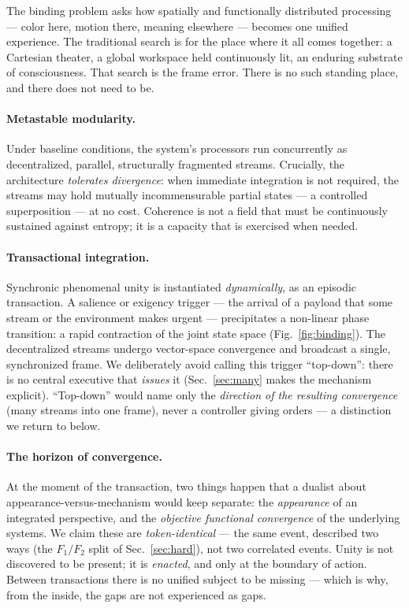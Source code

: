 \documentclass[11pt]{article}
\begin{document}
The binding problem asks how spatially and functionally distributed processing --- color here, motion
there, meaning elsewhere --- becomes one unified experience. The traditional search is for the place
where it all comes together: a Cartesian theater, a global workspace held continuously lit, an
enduring substrate of consciousness. That search is the frame error. There is no such standing place,
and there does not need to be.

\paragraph{Metastable modularity.} Under baseline conditions, the system's processors run concurrently
as decentralized, parallel, structurally fragmented streams. Crucially, the architecture
\emph{tolerates divergence}: when immediate integration is not required, the streams may hold mutually
incommensurable partial states --- a controlled superposition --- at no cost. Coherence is not a
field that must be continuously sustained against entropy; it is a capacity that is exercised when
needed.

\paragraph{Transactional integration.} Synchronic phenomenal unity is instantiated \emph{dynamically},
as an episodic transaction. A salience or exigency trigger --- the arrival of a payload that some stream
or the environment makes urgent --- precipitates a non-linear phase transition: a rapid contraction of
the joint state space (Fig.~\ref{fig:binding}). The decentralized streams undergo vector-space
convergence and broadcast a single, synchronized frame. We deliberately avoid calling this trigger
``top-down'': there is no central executive that \emph{issues} it (Sec.~\ref{sec:many} makes the
mechanism explicit). ``Top-down'' would name only the \emph{direction of the resulting convergence}
(many streams into one frame), never a controller giving orders --- a distinction we return to below.

\paragraph{The horizon of convergence.} At the moment of the transaction, two things happen that a
dualist about appearance-versus-mechanism would keep separate: the \emph{appearance} of an integrated
perspective, and the \emph{objective functional convergence} of the underlying systems. We claim these
are \emph{token-identical} --- the same event, described two ways (the $F_1/F_2$ split of
Sec.~\ref{sec:hard}), not two correlated events. Unity is not discovered to be present; it is
\emph{enacted}, and only at the boundary of action. Between transactions there is no unified subject to
be missing --- which is why, from the inside, the gaps are not experienced as gaps.
\end{document}
